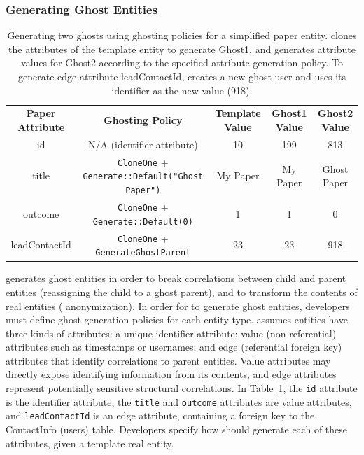 \subsubsection{Generating Ghost Entities}
\label{sec:ghosting}

\begin{table}[t!]
    \centering
    \footnotesize
\begin{tabular}{@{}ccccc@{}}
\textbf{Paper Attribute} & \textbf{Ghosting Policy} & \textbf{Template Value} & \textbf{Ghost1 Value} & \textbf{Ghost2 Value} 
  \\ \cmidrule(r){1-5}
    {id} & N/A (identifier attribute) & 10 & 199 & 813 \\
{title} & \texttt{CloneOne} + \texttt{Generate::Default("Ghost Paper")} & My Paper & My
    Paper & Ghost Paper \\
{outcome} & \texttt{CloneOne} + \texttt{Generate::Default(0)} & 1 & 1 & 0 \\
{leadContactId} & \texttt{CloneOne} + \texttt{GenerateGhostParent} & 23 & 23 & 918 \\
\end{tabular}
    \caption{Generating two ghosts using ghosting policies for a simplified paper entity.
    \sys clones the attributes of the template entity to generate Ghost1, and generates
    attribute values for Ghost2 according to the specified attribute generation policy. To generate edge attribute leadContactId, \sys creates a new ghost user and uses its identifier as the new value (918).}
    \label{tab:ghosting}
\end{table}

\sys generates ghost entities in order to break correlations between child and parent entities
(reassigning the child to a ghost parent), and to transform the contents of real entities (\eg
anonymization). In order for \sys to generate ghost entities,
developers must define ghost generation policies for each entity type.  \sys assumes entities have
three kinds of attributes: a unique identifier attribute; value (non-referential) attributes such as
timestamps or usernames; and edge (referential foreign key) attributes that identify correlations to
parent entities.  Value attributes may directly expose identifying information from its contents,
and edge attributes represent potentially sensitive structural correlations. In
Table~\ref{tab:ghosting}, the \texttt{id} attribute is the identifier attribute, the \texttt{title}
and \texttt{outcome} attributes are value attributes, and \texttt{leadContactId} is an edge
attribute, containing a foreign key to the ContactInfo (users) table.  Developers specify how \sys
should generate each of these attributes, given a template real entity.

